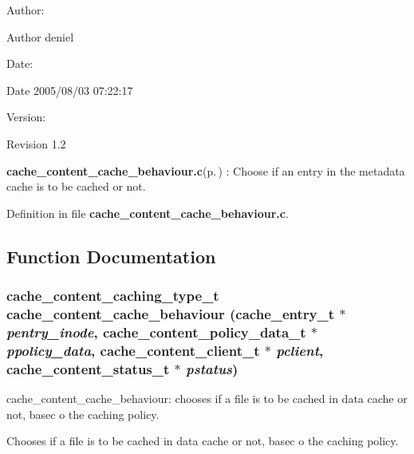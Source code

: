 \begin{Desc}
\item[Author:]\begin{Desc}
\item[Author]deniel \end{Desc}
\end{Desc}
\begin{Desc}
\item[Date:]\begin{Desc}
\item[Date]2005/08/03 07:22:17 \end{Desc}
\end{Desc}
\begin{Desc}
\item[Version:]\begin{Desc}
\item[Revision]1.2 \end{Desc}
\end{Desc}
{\bf cache\_\-content\_\-cache\_\-behaviour.c}{\rm (p.\,\pageref{cache__content__cache__behaviour_8c})} : Choose if an entry in the metadata cache is to be cached or not.

Definition in file {\bf cache\_\-content\_\-cache\_\-behaviour.c}.

\subsection{Function Documentation}
\subsubsection{\setlength{\rightskip}{0pt plus 5cm}cache\_\-content\_\-caching\_\-type\_\-t cache\_\-content\_\-cache\_\-behaviour (cache\_\-entry\_\-t $\ast$ {\em pentry\_\-inode}, cache\_\-content\_\-policy\_\-data\_\-t $\ast$ {\em ppolicy\_\-data}, cache\_\-content\_\-client\_\-t $\ast$ {\em pclient}, cache\_\-content\_\-status\_\-t $\ast$ {\em pstatus})}\label{cache__content__cache__behaviour_8c_a0}


cache\_\-content\_\-cache\_\-behaviour: chooses if a file is to be cached in data cache or not, basec o the caching policy.

Chooses if a file is to be cached in data cache or not, basec o the caching policy.

